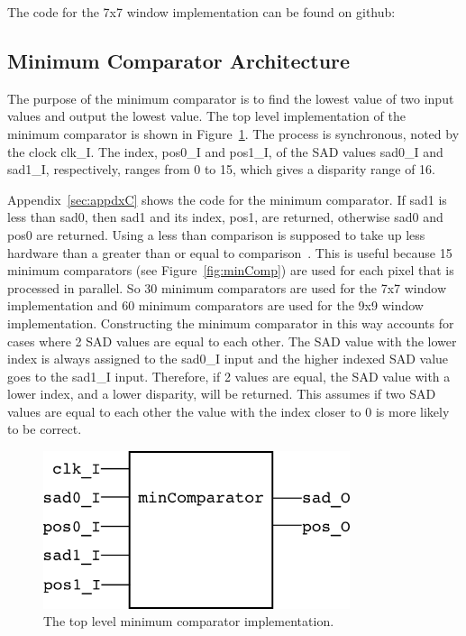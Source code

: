The code for the 7x7 window implementation can be found on github:
\\

\subsection{Minimum Comparator Architecture}

The purpose of the minimum comparator is to find the lowest value of two input values and output the lowest value. The top level implementation of the minimum comparator is shown in Figure~\ref{fig:minComp_rtl}. The process is synchronous, noted by the clock clk\_I. The index, pos0\_I and pos1\_I, of the SAD values sad0\_I and sad1\_I, respectively, ranges from 0 to 15, which gives a disparity range of 16. 

Appendix~\ref{sec:appdxC} shows the code for the minimum comparator. If sad1 is less than sad0, then sad1 and its index, pos1, are returned, otherwise sad0 and pos0 are returned. Using a less than comparison is supposed to take up less hardware than a greater than or equal to comparison~\cite{lessThan}. This is useful because 15 minimum comparators (see Figure~\ref{fig:minComp}) are used for each pixel that is processed in parallel. So 30 minimum comparators are used for the 7x7 window implementation and 60 minimum comparators are used for the 9x9 window implementation. Constructing the minimum comparator in this way accounts for cases where 2 SAD values are equal to each other. The SAD value with the lower index is always assigned to the sad0\_I input and the higher indexed SAD value goes to the sad1\_I input. Therefore, if 2 values are equal, the SAD value with a lower index, and a lower disparity, will be returned. This assumes if two SAD values are equal to each other the value with the index closer to 0 is more likely to be correct.

\begin{figure}[h]
	\begin{center}
		\includegraphics[width=90mm]{figures/minComparator_rtl.png}
		\captionfonts
		\caption{The top level minimum comparator implementation.}
		\label{fig:minComp_rtl}
	\end{center}
\end{figure}

